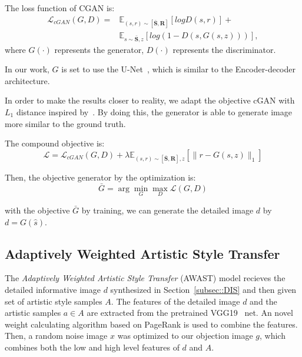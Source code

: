 \documentclass[10pt,twocolumn,letterpaper]{article}
\begin{document}
The loss function of CGAN is:
\begin{equation}
  \begin{split}
\mathcal{L}_{cGAN}(G, D) =& \mathbb{E}_{(s, r)\sim \bm{[\bar{S}, R]}}[logD(s, r)] +\\
&\mathbb{E}_{s\sim \bm{\bar{S}}, z}[log(1-D(s, G(s, z)))],
\end{split}
\end{equation}
where $G(\cdot)$ represents the generator, $D(\cdot)$ represents the discriminator.

In our work, $G$ is set to use the U-Net~\cite{ronneberger2015u}, which is similar to the Encoder-decoder architecture.

In order to make the results closer to reality, we adapt the objective cGAN with $L_1$ distance inspired by~\cite{pathak2016context}. By doing this, the generator is able to generate image more similar to the ground truth.

The compound objective is:
\begin{equation}
\mathcal{L} =  \mathcal{L}_{cGAN}(G, D) + \lambda \mathbb{E}_{(s, r)\sim \bm{[\bar{S}, R]}, z}[\|r-G(s, z)\|_1]
\end{equation}

Then, the objective generator by the optimization is:
\begin{equation}
 \bar{G} = \arg \min_G \max_D \mathcal{L}(G, D)
\end{equation}

with the objective $\bar{G}$ by training, we can generate the detailed image $d$ by $d = G(\hat{s})$.

%
%
%
%
%

\subsection{Adaptively Weighted Artistic Style Transfer} \label{subsec::AWAST}
The \textit{Adaptively Weighted Artistic Style Transfer} (AWAST) model recieves the detailed informative image $d$ synthesized in Section~\ref{subsec::DIS} and then given set of artistic style samples $A$. The features of the detailed image $d$ and the artistic samples $a\in A$ are extracted from the pretrained VGG19~\cite{simonyan2014very} net. An novel weight calculating algorithm based on PageRank is used to combine the features. Then, a random noise image $x$ was optimized to our objection image $g$, which combines both the low and high level features of $d$ and $A$.
\end{document}
